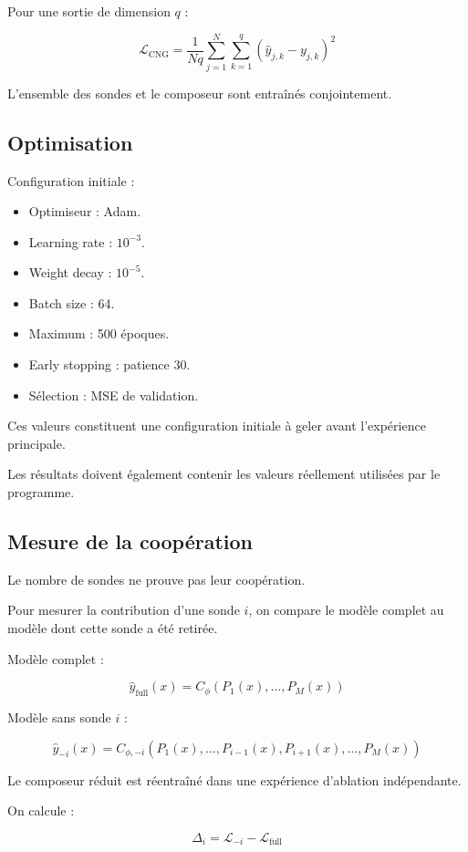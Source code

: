 \documentclass[11pt,a4paper]{article}
\newcommand{\Loss}{\mathcal{L}}
\begin{document}
Pour une sortie de dimension $q$ :

\[
\Loss_{\mathrm{CNG}}
=
\frac{1}{Nq}
\sum_{j=1}^{N}
\sum_{k=1}^{q}
(\widehat y_{j,k}-y_{j,k})^2
\]

L'ensemble des sondes et le composeur sont entraînés
conjointement.

\subsection{Optimisation}

Configuration initiale :

\begin{itemize}
    \item Optimiseur : Adam.
    \item Learning rate : $10^{-3}$.
    \item Weight decay : $10^{-5}$.
    \item Batch size : 64.
    \item Maximum : 500 époques.
    \item Early stopping : patience 30.
    \item Sélection : MSE de validation.
\end{itemize}

Ces valeurs constituent une configuration initiale
à geler avant l'expérience principale.

Les résultats doivent également contenir les valeurs
réellement utilisées par le programme.

\subsection{Mesure de la coopération}

Le nombre de sondes ne prouve pas leur coopération.

Pour mesurer la contribution d'une sonde $i$,
on compare le modèle complet au modèle dont cette
sonde a été retirée.

Modèle complet :

\[
\widehat y_{\mathrm{full}}(x)
=
C_\phi(P_1(x),\ldots,P_M(x))
\]

Modèle sans sonde $i$ :

\[
\widehat y_{-i}(x)
=
C_{\phi,-i}(P_1(x),\ldots,P_{i-1}(x),
P_{i+1}(x),\ldots,P_M(x))
\]

Le composeur réduit est réentraîné dans une expérience
d'ablation indépendante.

On calcule :

\[
\Delta_i=
\Loss_{-i}-\Loss_{\mathrm{full}}
\]
\end{document}
